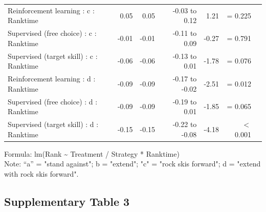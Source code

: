\documentclass{article}
\begin{document}
\begin{longtable}{lrrrrrl}
Reinforcement learning : c : Ranktime & 0.05 & 0.05 & -0.03 to 0.12 & 1.21 &  =  0.225 \\ 
Supervised (free choice) : c : Ranktime & -0.01 & -0.01 & -0.11 to 0.09 & -0.27 &  =  0.791 \\ 
Supervised (target skill) : c : Ranktime & -0.06 & -0.06 & -0.13 to 0.01 & -1.78 &  =  0.076 \\ 
Reinforcement learning : d : Ranktime & -0.09 & -0.09 & -0.17 to -0.02 & -2.51 &  =  0.012 \\ 
Supervised (free choice) : d : Ranktime & -0.09 & -0.09 & -0.19 to 0.01 & -1.85 &  =  0.065 \\ 
Supervised (target skill) : d : Ranktime & -0.15 & -0.15 & -0.22 to -0.08 & -4.18 &  $<$  0.001 \\ 
\bottomrule
\end{longtable}
\begin{minipage}{\linewidth}
Formula: lm(Rank \textasciitilde{} Treatment / Strategy * Ranktime)\\
Note: “a” = "stand against"; b = "extend"; "c" = "rock skis forward"; d = "extend with rock skis forward". 
\end{minipage}

\subsection{Supplementary Table 3}\label{Supplementarytable_ranking_3}
\end{document}
